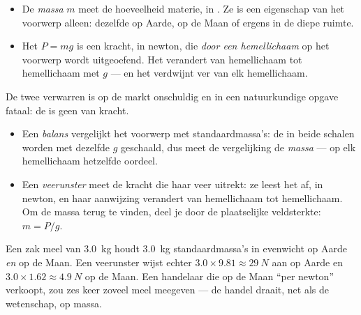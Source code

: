 \begin{remark}\label{rem:g10:universal-gravitation:massweight}
\begin{itemize}
  \item De \emph{massa} $m$ meet de hoeveelheid materie, in . Ze
        is een eigenschap van het voorwerp alleen: dezelfde op Aarde, op
        de Maan of ergens in de diepe ruimte.
  \item Het \emph{} $P = mg$ is een kracht, in newton, die
        \emph{door een hemellichaam} op het voorwerp wordt uitgeoefend.
        Het verandert van hemellichaam tot hemellichaam met $g$ --- en
        het verdwijnt ver van elk hemellichaam.
\end{itemize}
De twee verwarren is op de markt onschuldig en in een natuurkundige
opgave fataal: de  is geen  van kracht.
\end{remark}

\begin{method}\label{met:g10:universal-gravitation:instruments}
\begin{itemize}
  \item Een \emph{balans} vergelijkt het voorwerp met standaardmassa's:
        de  in beide schalen worden met dezelfde $g$
        geschaald, dus meet de vergelijking de \emph{massa} --- op elk
        hemellichaam hetzelfde oordeel.
  \item Een \emph{veerunster} meet de kracht die haar veer uitrekt: ze
        leest het \emph{} af, in newton, en haar aanwijzing
        verandert van hemellichaam tot hemellichaam. Om de massa terug
        te vinden, deel je door de plaatselijke veldsterkte:
        $m = P/g$.
\end{itemize}
\end{method}

\begin{example}\label{ex:g10:universal-gravitation:flour}
Een zak meel van \qty{3.0}{kg} houdt \qty{3.0}{kg} standaardmassa's in
evenwicht op Aarde \emph{en} op de Maan. Een veerunster wijst echter
$3.0 \times 9.81 \approx \qty{29}{N}$ aan op Aarde en
$3.0 \times 1.62 \approx \qty{4.9}{N}$ op de Maan. Een handelaar die op
de Maan ``per newton'' verkoopt, zou zes keer zoveel meel meegeven ---
de handel draait, net als de wetenschap, op massa.
\end{example}


